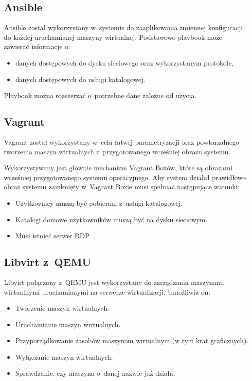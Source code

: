 \documentclass[../opis-rozwiazania.tex]{subfiles}
\begin{document}
\subsection{Ansible}
Ansible został wykorzystany w~systemie do zaaplikowania zmiennej konfiguracji do każdej uruchamianej maszyny wirtualnej.
Podstawowo playbook może zawierać informacje o:
\begin{itemize}
  \item danych dostępowych do dysku sieciowego oraz wykorzystanym protokole,
  \item danych dostępowych do usługi katalogowej.
\end{itemize}
Playbook można rozszerzać o~potrzebne dane zależne od użycia.

\subsection{Vagrant}
Vagrant został wykorzystany w~celu łatwej parametryzacji oraz powtarzalnego tworzenia maszyn wirtualnych z~przygotowanego wcześniej obrazu systemu.

Wykorzystywany jest głównie mechanizm Vagrant Boxów, które są obrazami wcześniej przygotowanego systemu operacyjnego.
Aby system działał prawidłowo obraz systemu zamknięty w~Vagrant Boxie musi spełniać następujące warunki:
\begin{itemize}
  \item Użytkownicy muszą być pobierani z~usługi katalogowej.
  \item Katalogi domowe użytkowników muszą być na dysku sieciowym.
  \item Musi istnieć serwer RDP
\end{itemize}

\subsection{Libvirt z~QEMU}
Libvirt połączony z~QEMU jest wykorzystany do zarządzania maszynami wirtualnymi uruchamianymi na serwerze wirtualizacji.
Umożliwia on:
\begin{itemize}
  \item Tworzenie maszyn wirtualnych.
  \item Uruchamianie maszyn wirtualnych.
  \item Przyporządkowanie zasobów maszynom wirtualnym (w tym krat graficznych).
  \item Wyłączanie maszyn wirtualnych.
  \item Sprawdzanie, czy maszyna o~danej nazwie już działa.
\end{itemize}
\end{document}
